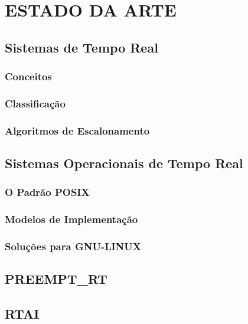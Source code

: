 \chapter{ESTADO DA ARTE}
\label{cap:estadoarte}

\section{Sistemas de Tempo Real}
\subsection{Conceitos}
\subsection{Classificação}
\subsection{Algoritmos de Escalonamento}

\section{Sistemas Operacionais de Tempo Real}
\subsection{O Padrão POSIX}
\subsection{Modelos de Implementação}
\subsection{Soluções para GNU-LINUX}

\section{PREEMPT\_RT}

\section{RTAI}